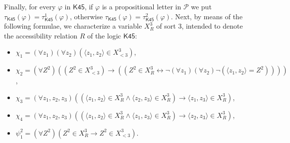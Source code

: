 \documentclass{fundam}
\renewcommand{\And}{\wedge}
\newcommand{\Kqc}{\mathsf{K45}}
\newcommand{\TKqc}{\tau_{\Kqc}}
\newcommand{\TKqcuno}{\tau_{\Kqc}^{1}}
\newcommand{\TKqcdue}{\tau_{\Kqc}^{2}}
\begin{document}
Finally, for every $\varphi$ in $\Kqc$, if $\varphi$ is a
propositional letter in $\mathcal{P}$ we put $\TKqc(\varphi) =
\TKqcuno(\varphi)$, otherwise $\TKqc(\varphi) = \TKqcdue(\varphi)$.
Next, by means of the following formulae, we characterize a variable
$X_R^3$ of sort 3, intended to denote the accessibility relation $R$
of the logic $\Kqc$:
\begin{itemize}
\item $\chi_1 = (\forall z_1)(\forall z_2)(\langle z_1, z_2\rangle \in X_{< 3}^3)$,

\item $\chi_2 = (\forall Z^{2})((Z^{2} \in X_{< 3}^3) \rightarrow ((Z^{2} \in X_R^{3} \leftrightarrow \neg (\forall
    z_1)(\forall z_2)\neg(\langle z_1,z_2\rangle = Z^{2}))))$,

\item $\chi_3 = (\forall z_1,z_2,z_3)((\langle
    z_1,z_2\rangle \in X_R^3 \And \langle z_2,z_3\rangle \in
    X_R^3)\rightarrow \langle z_1,z_3\rangle \in X_R^3)$,

\item $\chi_4 = (\forall z_1,z_2,z_3)((\langle
    z_1,z_2\rangle \in X_R^3 \And \langle z_1,z_3\rangle \in
    X_R^3)\rightarrow \langle z_2,z_3\rangle \in X_R^3)$,

\item $\psi_1^2 = (\forall Z^2)(Z^2 \in X_R^3 \rightarrow Z^2 \in X_{<
3}^3)$.
\end{itemize}
\end{document}
